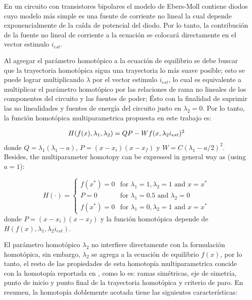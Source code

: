 \documentclass[conference,letterpaper,twocolumn]{IEEEtran}
\begin{document}
En un circuito con transistores bipolares el modelo de Ebers-Moll contiene
diodos cuyo modelo m\'as simple es una fuente de corriente no lineal la cual depende exponencialmente de la caída de potencial del diodo. Por lo tanto, la contribución  de la fuente no lineal de corriente a la ecuación se colocará
directamente en el vector estimulo $i_{est}$.

Al agregar el par\'ametro homot\'opico  a la ecuación de equilibrio se debe buscar que la trayectoria homot\'opica sigua una trayectoria lo m\'as suave posible; esto se puede lograr multiplicando $\lambda$ por el vector estimulo $i_{est}$, lo cual es equivalente a multiplicar el parámetro homotópico por las relaciones
de rama no lineales de los componentes del circuito y las fuentes de poder;
Ésto con la finalidad
de suprimir las no linealidades y fuentes de energía del circuito  justo en $\lambda_2=0$. Por lo tanto, la función homotópica multiparametrica propuesta en este trabajo es:

\begin{equation}
{\small
\begin{array}{l}
H(f(x),\lambda_1, \lambda_2 )=QP - Wf(x,\lambda_2i_{est})^2
\end{array}}
\label{homotopiaPx3}
\end{equation}
donde $Q=\lambda_1(\lambda_1-a)$, $P=(x-x_i)(x-x_f)$ y $W=C(\lambda_1-a/2)^2$. Besides, the
multiparameter homotopy can be expressed in general way as (using $a=1$):

{\small
\begin{displaymath}
{H}(\cdot)= \left\{\begin{array}{rl}
f(x^*)=0 & \textrm{for  $\lambda_1=1, \lambda_2=1$ and $x=x^*$}\\
P=0 & \textrm{for $\lambda_1=0.5$ and $\lambda_2=0$}\\
f(x^*)=0 & \textrm{for $\lambda_1=0, \lambda_2=1$ and $x=x^*$}
\end{array}\right.
\end{displaymath}
}
donde $P=(x-x_i)(x-x_f)$ y la función homotópica depende de ${H}({f}({x}),\lambda_1,\lambda_2{i_{est}})$.


El parámetro homotópico $\lambda_2$ no interfiere directamente con la formulación homotópica, sin embargo, $\lambda_2$ se agrega a la ecuación de equilibrio $f(x)$, por lo tanto,
el resto de las propiedades de esta homotopía multiparametrica concide con la homotopía reportada en \cite{xxx1}, como lo es: ramas simétricas, eje de simetría, punto de inicio
y punto final de la trayectoria homotópica y criterio de paro. 
En resumen, la homotopía doblemente acotada tiene las siguientes características:
\end{document}
